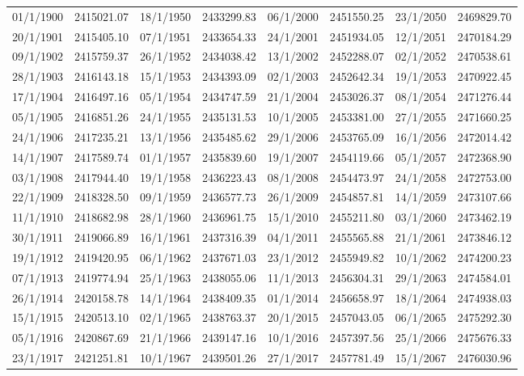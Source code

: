 \begin{table}
{\small
\begin{tabular}{cc|cc|cc|cc}
01/1/1900 & 2415021.07 & 18/1/1950 & 2433299.83 & 06/1/2000 & 2451550.25 & 23/1/2050 & 2469829.70\\
20/1/1901 & 2415405.10 & 07/1/1951 & 2433654.33 & 24/1/2001 & 2451934.05 & 12/1/2051 & 2470184.29\\
09/1/1902 & 2415759.37 & 26/1/1952 & 2434038.42 & 13/1/2002 & 2452288.07 & 02/1/2052 & 2470538.61\\
28/1/1903 & 2416143.18 & 15/1/1953 & 2434393.09 & 02/1/2003 & 2452642.34 & 19/1/2053 & 2470922.45\\
17/1/1904 & 2416497.16 & 05/1/1954 & 2434747.59 & 21/1/2004 & 2453026.37 & 08/1/2054 & 2471276.44\\
05/1/1905 & 2416851.26 & 24/1/1955 & 2435131.53 & 10/1/2005 & 2453381.00 & 27/1/2055 & 2471660.25\\
24/1/1906 & 2417235.21 & 13/1/1956 & 2435485.62 & 29/1/2006 & 2453765.09 & 16/1/2056 & 2472014.42\\
14/1/1907 & 2417589.74 & 01/1/1957 & 2435839.60 & 19/1/2007 & 2454119.66 & 05/1/2057 & 2472368.90\\
03/1/1908 & 2417944.40 & 19/1/1958 & 2436223.43 & 08/1/2008 & 2454473.97 & 24/1/2058 & 2472753.00\\
22/1/1909 & 2418328.50 & 09/1/1959 & 2436577.73 & 26/1/2009 & 2454857.81 & 14/1/2059 & 2473107.66\\
11/1/1910 & 2418682.98 & 28/1/1960 & 2436961.75 & 15/1/2010 & 2455211.80 & 03/1/2060 & 2473462.19\\
30/1/1911 & 2419066.89 & 16/1/1961 & 2437316.39 & 04/1/2011 & 2455565.88 & 21/1/2061 & 2473846.12\\
19/1/1912 & 2419420.95 & 06/1/1962 & 2437671.03 & 23/1/2012 & 2455949.82 & 10/1/2062 & 2474200.23\\
07/1/1913 & 2419774.94 & 25/1/1963 & 2438055.06 & 11/1/2013 & 2456304.31 & 29/1/2063 & 2474584.01\\
26/1/1914 & 2420158.78 & 14/1/1964 & 2438409.35 & 01/1/2014 & 2456658.97 & 18/1/2064 & 2474938.03\\
15/1/1915 & 2420513.10 & 02/1/1965 & 2438763.37 & 20/1/2015 & 2457043.05 & 06/1/2065 & 2475292.30\\
05/1/1916 & 2420867.69 & 21/1/1966 & 2439147.16 & 10/1/2016 & 2457397.56 & 25/1/2066 & 2475676.33\\
23/1/1917 & 2421251.81 & 10/1/1967 & 2439501.26 & 27/1/2017 & 2457781.49 & 15/1/2067 & 2476030.96\\

\end{tabular}}
\end{table}
